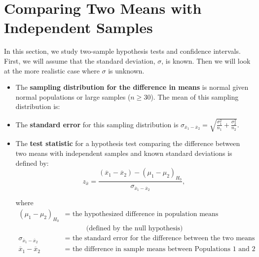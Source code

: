 \documentclass[12pt, letterpaper]{article}
\newcommand{\ds}{\displaystyle}
\theoremstyle{definition}
\begin{document}
\enlargethispage{2\baselineskip}


\section*{Comparing Two Means with Independent Samples}

\vspace*{-.1in}

\noindent In this section, we study two-sample hypothesis tests and confidence intervals.  First, we will assume that the standard deviation, $\sigma$, is known.  Then we will look at the more realistic case where $\sigma$ is unknown.


\begin{statement}
\begin{itemize}

\item The \textbf{sampling distribution for the difference in means} is normal given normal populations or large samples ($n\geq 30$).  The mean of this sampling distribution is:
\vspace*{.3in}

\item The \textbf{standard error} for this sampling distribution is $\ds \sigma_{\overline{x}_1 - \overline{x}_2} = \sqrt{\frac{\sigma_1^2}{n_1}+\frac{\sigma_2^2}{n_2}}. $


\item The \textbf{test statistic} for a hypothesis test comparing the difference between two means with independent samples and known standard deviations is defined by:
$$ z_{\overline{x}} = \frac{(\overline{x}_1 - \overline{x}_2)-(\mu_1-\mu_2)_{H_0}}{\sigma_{\overline{x}_1 - \overline{x}_2}}, $$

where
\vspace*{-.25in}
\begin{align*}
(\mu_1-\mu_2)_{H_0} &= \text{ the hypothesized difference in population means }\\
 & ~~~~~~~~~~~~~~\text{(defined by the null hypothesis)}\\
\sigma_{\overline{x}_1 - \overline{x}_2} &= \text{ the standard error for the difference between the two means}\\
\overline{x}_1 - \overline{x}_2 &= \text{ the difference in sample means between Populations 1 and 2}
\end{align*}


\end{itemize}
\end{statement}
\end{document}

